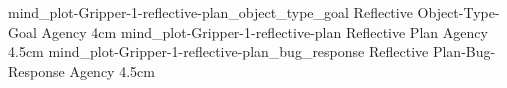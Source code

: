 {\experimentcausegroupplots{\dataappendixmaxtime}
                           {\dataappendixexperimentonemaxtime}
                           {\dataappendixexperimenttwomaxtime}
                           {\dataappendixexperimentthreemaxtime}
                           {\dataappendixexperimentonename}
                           {\dataappendixexperimenttwoname}
                           {\dataappendixexperimentthreename}
                           {\dataappendixexperimentoneprettyname}
                           {\dataappendixexperimenttwoprettyname}
                           \experimentcausegroupplotscontinued{\dataappendixexperimentthreeprettyname}
                                                              {mind_plot-Gripper-1-reflective-plan_object_type_goal}
                                                              {Reflective Object-Type-Goal Agency}
                                                              {\experimentdatacommontablereference}
                                                              {4cm}}
{\experimentcausegroupplots{\dataappendixmaxtime}
                           {\dataappendixexperimentonemaxtime}
                           {\dataappendixexperimenttwomaxtime}
                           {\dataappendixexperimentthreemaxtime}
                           {\dataappendixexperimentonename}
                           {\dataappendixexperimenttwoname}
                           {\dataappendixexperimentthreename}
                           {\dataappendixexperimentoneprettyname}
                           {\dataappendixexperimenttwoprettyname}
                           \experimentcausegroupplotscontinued{\dataappendixexperimentthreeprettyname}
                                                              {mind_plot-Gripper-1-reflective-plan}
                                                              {Reflective Plan Agency}
                                                              {\experimentdatacommontablereference}
                                                              {4.5cm}}
{\experimentcausegroupplots{\dataappendixmaxtime}
                           {\dataappendixexperimentonemaxtime}
                           {\dataappendixexperimenttwomaxtime}
                           {\dataappendixexperimentthreemaxtime}
                           {\dataappendixexperimentonename}
                           {\dataappendixexperimenttwoname}
                           {\dataappendixexperimentthreename}
                           {\dataappendixexperimentoneprettyname}
                           {\dataappendixexperimenttwoprettyname}
                           \experimentcausegroupplotscontinued{\dataappendixexperimentthreeprettyname}
                                                              {mind_plot-Gripper-1-reflective-plan_bug_response}
                                                              {Reflective Plan-Bug-Response Agency}
                                                              {\experimentdatacommontablereference}
                                                              {4.5cm}}
